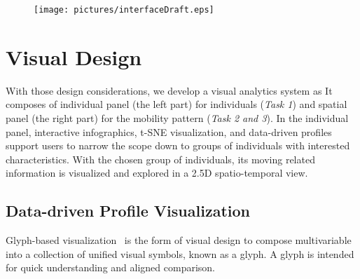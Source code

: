 \begin{figure}[htb!]
 \centering %
 \texttt{[image: pictures/interfaceDraft.eps]}
 \caption{}
 \label{fig:interfaceDraft}
\end{figure}


\section{Visual Design}
 

With those design considerations, we develop a visual analytics system as   It composes of individual panel (the left part) for individuals (\textit{Task 1}) and spatial panel (the right part) for the mobility pattern (\textit{Task 2 and 3}). In the individual panel, interactive infographics, t-SNE visualization, and data-driven profiles support users to narrow the scope down to groups of individuals with interested characteristics. With the chosen group of individuals, its moving related information is visualized and explored in a 2.5D spatio-temporal view.



\subsection{Data-driven Profile Visualization}

Glyph-based visualization~\cite{borgo2013glyph} is the form of visual design to compose multivariable into a collection of unified visual symbols, known as a glyph. A glyph is intended for quick understanding and aligned comparison. 

